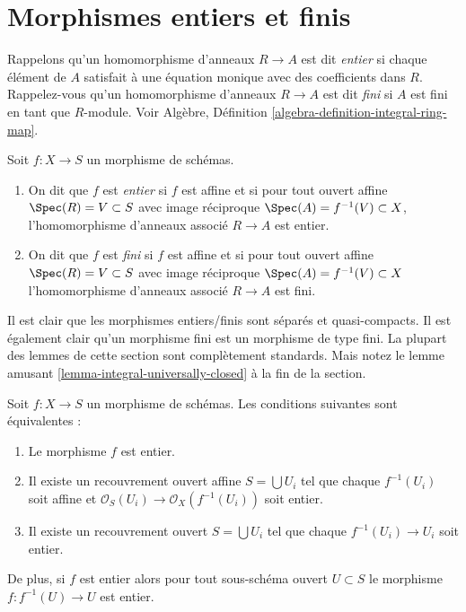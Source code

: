 \section{Morphismes entiers et finis}
\label{section-integral}

\noindent
Rappelons qu'un homomorphisme d'anneaux $R \to A$ est dit {\it
entier} si chaque élément de $A$ satisfait à une équation
monique avec des coefficients dans $R$. Rappelez-vous qu'un homomorphisme
d'anneaux $R \to A$ est dit {\it fini} si
$A$ est fini en tant que $R$-module. Voir Algèbre, Définition \ref{algebra-definition-integral-ring-map}.

\begin{definition}
\label{definition-integral}
Soit $f : X \to S$ un morphisme de schémas.
\begin{enumerate}
\item On dit que $f$ est {\it entier}
si $f$ est affine et si pour tout ouvert affine
$\Spec(R) = V \subset S$ avec image réciproque $\Spec(A) = f^{-1}(V) \subset X$, l'homomorphisme
d'anneaux associé $R \to A$ est entier.
\item On dit que $f$ est {\it fini}
si $f$ est affine et si pour tout ouvert affine
$\Spec(R) = V \subset S$ avec image réciproque $\Spec(A) = f^{-1}(V) \subset X$ l'homomorphisme
d'anneaux associé $R \to A$ est fini.
\end{enumerate}
\end{definition}

\noindent
Il est clair que les morphismes entiers/finis sont séparés
et quasi-compacts. Il est également clair qu'un morphisme
fini est un morphisme de type fini. La plupart des lemmes de
cette section sont complètement
standards. Mais notez le lemme amusant \ref{lemma-integral-universally-closed}
à la fin de la section.

\begin{lemma}
\label{lemma-integral-local}
Soit $f : X \to S$ un morphisme de schémas. Les conditions
suivantes sont équivalentes :
\begin{enumerate}
\item Le morphisme $f$ est entier.
\item Il existe un recouvrement ouvert affine $S = \bigcup U_i$
tel que chaque $f^{-1}(U_i)$
soit affine et $\mathcal{O}_S(U_i) \to \mathcal{O}_X(f^{-1}(U_i))$ soit entier.
\item Il existe un recouvrement ouvert $S = \bigcup U_i$
tel que chaque $f^{-1}(U_i) \to U_i$ soit entier.
\end{enumerate}
De plus, si $f$ est entier alors pour tout sous-schéma
ouvert $U \subset S$ le morphisme $f : f^{-1}(U) \to U$ est entier.
\end{lemma}

